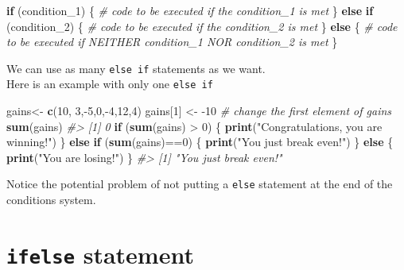 \documentclass[]{book}
\newenvironment{Shaded}{}{}
\newcommand{\CommentTok}[1]{\textcolor[rgb]{0.38,0.63,0.69}{\textit{#1}}}
\newcommand{\ControlFlowTok}[1]{\textcolor[rgb]{0.00,0.44,0.13}{\textbf{#1}}}
\newcommand{\DecValTok}[1]{\textcolor[rgb]{0.25,0.63,0.44}{#1}}
\newcommand{\KeywordTok}[1]{\textcolor[rgb]{0.00,0.44,0.13}{\textbf{#1}}}
\newcommand{\NormalTok}[1]{#1}
\newcommand{\OperatorTok}[1]{\textcolor[rgb]{0.40,0.40,0.40}{#1}}
\newcommand{\StringTok}[1]{\textcolor[rgb]{0.25,0.44,0.63}{#1}}
\theoremstyle{definition}
\theoremstyle{definition}
\theoremstyle{definition}
\theoremstyle{remark}
\begin{document}
\begin{Shaded}
\begin{Highlighting}[]
\ControlFlowTok{if}\NormalTok{ (condition_}\DecValTok{1}\NormalTok{) \{ }
\CommentTok{# code to be executed if the condition_1 is met}
\NormalTok{\} }\ControlFlowTok{else} \ControlFlowTok{if}\NormalTok{ (condition_}\DecValTok{2}\NormalTok{) \{}
\CommentTok{# code to be executed if the condition_2 is met}
\NormalTok{\} }\ControlFlowTok{else}\NormalTok{ \{}
\CommentTok{# code to be executed if NEITHER condition_1 NOR condition_2 is met}
\NormalTok{\}}
\end{Highlighting}
\end{Shaded}

We can use as many \texttt{else\ if} statements as we want.\\
Here is an example with only one \texttt{else\ if}

\begin{Shaded}
\begin{Highlighting}[]
\NormalTok{gains<-}\StringTok{ }\KeywordTok{c}\NormalTok{(}\DecValTok{10}\NormalTok{, }\DecValTok{3}\NormalTok{,}\OperatorTok{-}\DecValTok{5}\NormalTok{,}\DecValTok{0}\NormalTok{,}\OperatorTok{-}\DecValTok{4}\NormalTok{,}\DecValTok{12}\NormalTok{,}\DecValTok{4}\NormalTok{)}
\NormalTok{gains[}\DecValTok{1}\NormalTok{] <-}\StringTok{ }\DecValTok{-10} \CommentTok{# change the first element of gains}
\KeywordTok{sum}\NormalTok{(gains)}
\CommentTok{#> [1] 0}
\ControlFlowTok{if}\NormalTok{ (}\KeywordTok{sum}\NormalTok{(gains) }\OperatorTok{>}\StringTok{ }\DecValTok{0}\NormalTok{) \{}
  \KeywordTok{print}\NormalTok{(}\StringTok{"Congratulations, you are winning!"}\NormalTok{)}
\NormalTok{\} }\ControlFlowTok{else} \ControlFlowTok{if}\NormalTok{ (}\KeywordTok{sum}\NormalTok{(gains)}\OperatorTok{==}\DecValTok{0}\NormalTok{) \{}
  \KeywordTok{print}\NormalTok{(}\StringTok{"You just break even!"}\NormalTok{)}
\NormalTok{\} }\ControlFlowTok{else}\NormalTok{ \{}
  \KeywordTok{print}\NormalTok{(}\StringTok{"You are losing!"}\NormalTok{)}
\NormalTok{\}}
\CommentTok{#> [1] "You just break even!"}
\end{Highlighting}
\end{Shaded}

Notice the potential problem of not putting a \texttt{else} statement at
the end of the conditions system.

\hypertarget{ifelse-statement}{%
\section{\texorpdfstring{\texttt{ifelse}
statement}{ifelse statement}}\label{ifelse-statement}}
\end{document}

